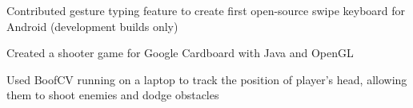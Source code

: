 \documentclass[]{deedy-resume-openfont}
\begin{document}
\begin{minipage}[t]{0.67\textwidth}
\begin{tightemize}
	\item Contributed gesture typing feature to create first open-source swipe keyboard for Android (development builds only)
\end{tightemize}
\sectionsep

\begin{tightemize}
	\item Created a shooter game for Google Cardboard with Java and OpenGL 
	\item Used BoofCV running on a laptop to track the position of player’s head, allowing them to shoot enemies and dodge obstacles
\end{tightemize}
\sectionsep

\end{minipage} 
\end{document}
